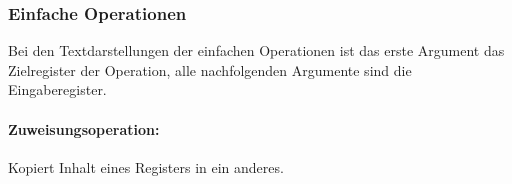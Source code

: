 \documentclass[twoside,a4paper,fleqn,12pt]{book}
\begin{document}
\subsubsection{Einfache Operationen}

Bei den Textdarstellungen der einfachen Operationen ist das erste Argument das Zielregister der Operation, alle nachfolgenden
Argumente sind die Eingaberegister.

\newcommand\SeqOpSample[2]{
  \renewcommand{\baselinestretch}{1.0}\normalsize
  \emph{Beispiel und Zwischencode:}\\
  \makebox[\textwidth]{
    \centering
    \begin{minipage}{7cm}\end{minipage}
    \hspace{-2cm}\begin{minipage}{8cm}\end{minipage}
    \label{fig:ir_example_#1}
  }
  \defltbaselinestretch\normalsize
}
\newcommand\SeqOpSampleStackedSeparate[3]{
  \vspace*{1em}
  \emph{Beispiel und Zwischencode:}
  \vspace*{-1em}
  \renewcommand{\baselinestretch}{1.0}\normalsize
    \begin{center}
    \begin{minipage}{7cm}\end{minipage}
    \begin{minipage}{\textwidth}\end{minipage}
    \label{fig:ir_example_#1}
    \end{center}
    \vspace*{-1em}
  \defltbaselinestretch\normalsize
}
\newcommand\SeqOpSampleStacked[2]{\SeqOpSampleStackedSeparate{#1}{#1}{#2}}

\paragraph{Zuweisungsoperation:} Kopiert Inhalt eines Registers in ein anderes.
\end{document}
